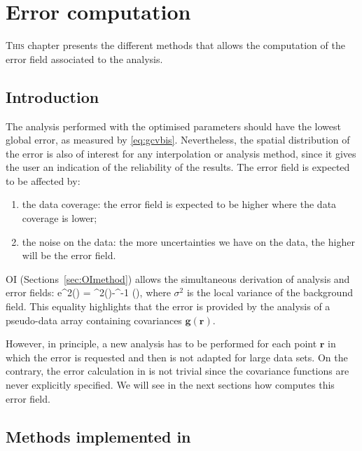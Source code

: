 \chapter{Error computation\label{chap:error}}
\vspace*{-1cm}
\lettrine[lines=2, loversize=-0.1, lraise=0.1]{T}{his} chapter presents the different methods that allows the computation of the error field associated to the analysis.  

\minitoc

\section{Introduction}

The analysis performed with the optimised parameters should have the lowest global error, as measured by \eqref{eq:gcvbis}. Nevertheless, the spatial distribution of the error is also of interest for any interpolation or analysis method, since it gives the user an indication of the reliability of the results. The error field is expected to be affected by:
\begin{enumerate}
\item the data coverage: the error field is expected to be higher where the data coverage is lower;
\item the noise on the data: the more uncertainties we have on the data, the higher will be the error field.
\end{enumerate}

OI (Sections~\ref{sec:OImethod}) allows the simultaneous derivation of analysis and error fields:
\be
e^{2}() = \sigma^{2}()-^{-1}  (),
\label{eq:erroroi}
\ee
where $\sigma^{2}$ is the local variance of the background field. This equality highlights that the error is provided by the analysis of a pseudo-data array containing covariances $\mathbf{g}(\mathbf{r})$. 

However, in principle, a new analysis has to be performed for each point $\mathbf{r}$ in which the error is requested and then is not adapted for large data sets. On the contrary, the error calculation in \diva is not trivial since the covariance functions are never explicitly specified. We will see in the next sections how \diva computes this error field.

\section{Methods implemented in \diva}

